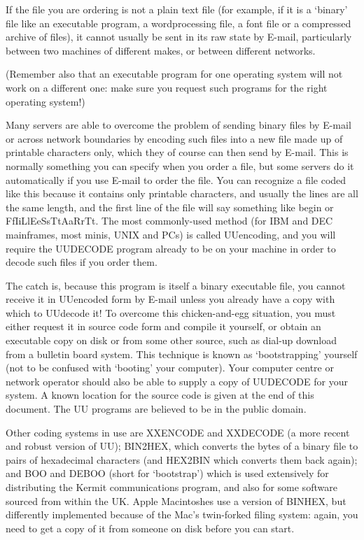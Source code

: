      If the file you are ordering is not a plain text file (for example,
     if it is a `binary' file like an executable program, a
     wordprocessing file, a font file or a compressed archive of files),
     it cannot usually be sent in its raw state by E-mail, particularly
     between two machines of different makes, or between different
     networks.

     (Remember also that an executable program for one operating system
     will not work on a different one: make sure you request such
     programs for the right operating system!)

     Many servers are able to overcome the problem of sending binary
     files by E-mail or across network boundaries by encoding such files
     into a new file made up of printable characters only, which they of
     course can then send by E-mail. This is normally something you can
     specify when you order a file, but some servers do it automatically
     if you use E-mail to order the file. You can recognize a file coded
     like this because it contains only printable characters, and
     usually the lines are all the same length, and the first line of
     the file will say something like {\tx begin} or
     {\tx FfIiLlEeSsTtAaRrTt}. The most commonly-used method (for IBM
     and DEC mainframes, most minis, UNIX and PCs) is called UUencoding,
     and you will require the UUDECODE program already to be on your
     machine in order to decode such files if you order them.

     The catch is, because this program is itself a binary executable
     file, you cannot receive it in UUencoded form by E-mail unless you
     already have a copy with which to UUdecode it! To overcome this
     chicken-and-egg situation, you must either request it in source
     code form and compile it yourself, or obtain an executable copy on
     disk or from some other source, such as dial-up download from a
     bulletin board system. This technique is known as `bootstrapping'
     yourself (not to be confused with `booting' your computer). Your
     computer centre or network operator should also be able to supply a
     copy of UUDECODE for your system. A known location for the source
     code is given at the end of this document. The UU programs are
     believed to be in the public domain.

     Other coding systems in use are XXENCODE and XXDECODE (a more
     recent and robust version of UU); BIN2HEX, which converts the bytes
     of a binary file to pairs of hexadecimal characters (and HEX2BIN
     which converts them back again); and BOO and DEBOO (short for
     `bootstrap') which is used extensively for distributing the Kermit
     communications program, and also for some software sourced from
     within the UK. Apple Macintoshes use a version of BINHEX, but
     differently implemented because of the Mac's twin-forked filing
     system: again, you need to get a copy of it from someone on disk
     before you can start.

